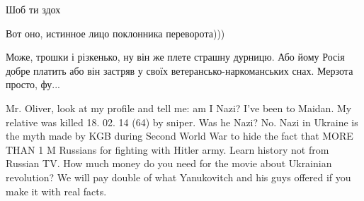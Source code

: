 \begin{itemize}
\begin{itemize}
\end{itemize} %

Шоб ти здох

\begin{itemize} %
Вот оно, истинное лицо поклонника переворота)))


Може, трошки і різкенько, ну він же плете страшну дурницю. Або йому Росія добре
платить або він застряв у своїх ветерансько-наркоманських снах. Мерзота просто,
фу...

\end{itemize} %


Mr. Oliver, look at my profile and tell me: am I Nazi? I've been to Maidan. My
relative was killed 18. 02. 14 (64) by sniper. Was he Nazi? No. Nazi in Ukraine
is the myth made by KGB during Second World War to hide the fact that MORE THAN
1 M Russians for fighting with Hitler army. Learn history not from Russian TV.
How much money do you need for the movie about Ukrainian revolution? We will
pay double of what Yanukovitch and his guys offered if you make it with real
facts.

\end{itemize} %
